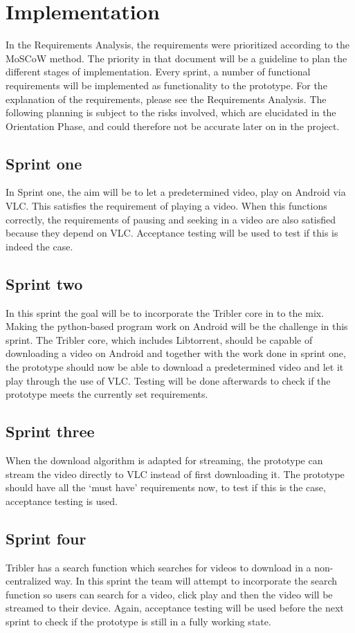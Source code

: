 \chapter{Implementation}
\thispagestyle{fancy}
\label{sec:impl}
In the Requirements Analysis, the requirements were prioritized according to the MoSCoW method. The priority in that document will be a guideline to plan the different stages of implementation. Every sprint, a number of functional requirements will be implemented as functionality to the prototype. For the explanation of the requirements, please see the Requirements Analysis. The following planning is subject to the risks involved, which are elucidated in the Orientation Phase, and could therefore not be accurate later on in the project.

\section{Sprint one}
In Sprint one, the aim will be to let a predetermined video, play on Android via VLC. This satisfies the requirement of playing a video. When this functions correctly, the requirements of pausing and seeking in a video are also satisfied because they depend on VLC. Acceptance testing will be used to test if this is indeed the case.
\section{Sprint two}
In this sprint the goal will be to incorporate the Tribler core in to the mix. Making the python-based program work on Android will be the challenge in this sprint. The Tribler core, which includes Libtorrent, should be capable of downloading a video on Android and together with the work done in sprint one, the prototype should now be able to download a predetermined video and let it play through the use of VLC. Testing will be done afterwards to check if the prototype meets the currently set requirements.
\section{Sprint three}
When the download algorithm is adapted for streaming, the prototype can stream the video directly to VLC instead of first downloading it. The prototype should have all the `must have' requirements now, to test if this is the case, acceptance testing is used.
\section{Sprint four}
Tribler has a search function which searches for videos to download in a non-centralized way. In this sprint the team will attempt to incorporate the search function so users can search for a video, click play and then the video will be streamed to their device. Again, acceptance testing will be used before the next sprint to check if the prototype is still in a fully working state.
